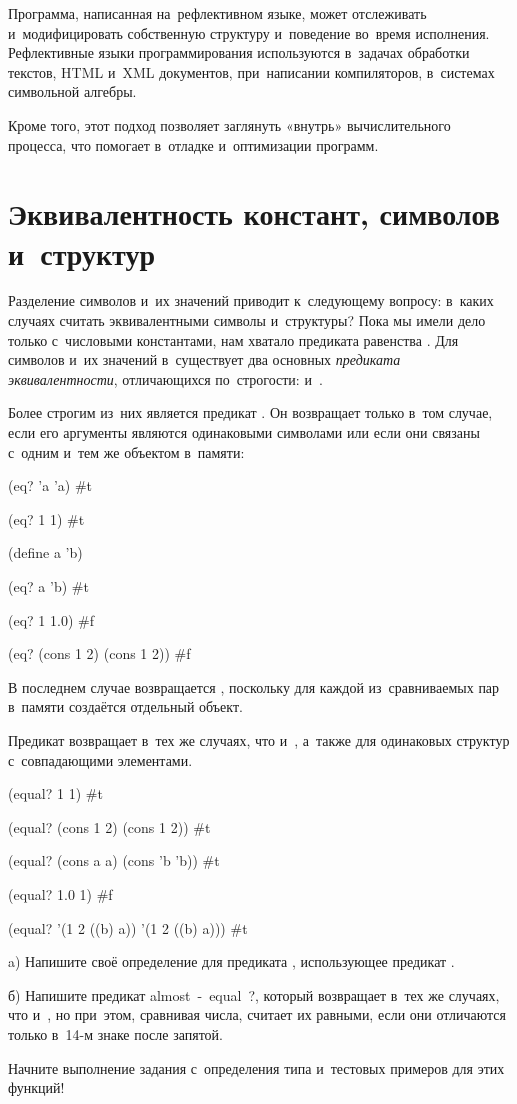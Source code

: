 Программа, написанная на~рефлективном языке, может отслеживать и~модифицировать собственную структуру и~поведение во~время исполнения. Рефлективные языки программирования используются в~задачах обработки текстов, HTML и~XML документов, при~написании компиляторов, в~системах символьной алгебры.

Кроме того, этот подход позволяет заглянуть «внутрь» вычислительного процесса, что помогает в~отладке и~оптимизации программ.

\section[4]{Эквивалентность констант, символов и~структур}%
Разделение символов и~их значений приводит к~следующему вопросу: в~каких случаях считать эквивалентными символы и~структуры? Пока мы имели дело только с~числовыми константами, нам хватало предиката равенства \s{=}. Для символов и~их значений в~\Scheme существует два основных \emph{предиката эквивалентности}, отличающихся по~строгости:  и~.

Более строгим из~них является предикат . Он возвращает  только в~том случае, если его аргументы являются одинаковыми символами или если они связаны с~одним и~тем же объектом в~памяти:

\REPL
  {(eq? 'a 'a)}
  {\#t}

\REPL
  {(eq? 1 1)}
  {\#t}

\REPLin
  {(define a 'b)}

\REPL
  {(eq? a 'b)}
  {\#t}

\REPL
  {(eq? 1 1.0)}
  {\#f}

\REPL
  {(eq? (cons 1 2) (cons 1 2))}
  {\#f}

В последнем случае возвращается , поскольку для каждой из~сравниваемых пар в~памяти создаётся отдельный объект.

Предикат  возвращает  в~тех же случаях, что и~, а~также для одинаковых структур с~совпадающими элементами.

\REPL
  {(equal? 1 1)}
  {\#t}

\REPL
  {(equal? (cons 1 2) (cons 1 2))}
  {\#t}

\REPL
  {(equal? (cons a a) (cons 'b 'b))}
  {\#t}

\REPL
  {(equal? 1.0 1)}
  {\#f}

\REPL
  {(equal? '(1 2 ((b) a)) '(1 2 ((b) a)))}
  {\#t} 

\begin{Assignment}

a) Напишите своё определение для предиката , использующее предикат .

б) Напишите предикат \si{almost-equal?}, который возвращает  в~тех же случаях, что и~, но при~этом, сравнивая числа, считает их равными, если они отличаются только в~14-м знаке после запятой.

\begin{Tip}
Начните выполнение задания с~определения типа и~тестовых примеров для этих функций!
\end{Tip}

\end{Assignment}

